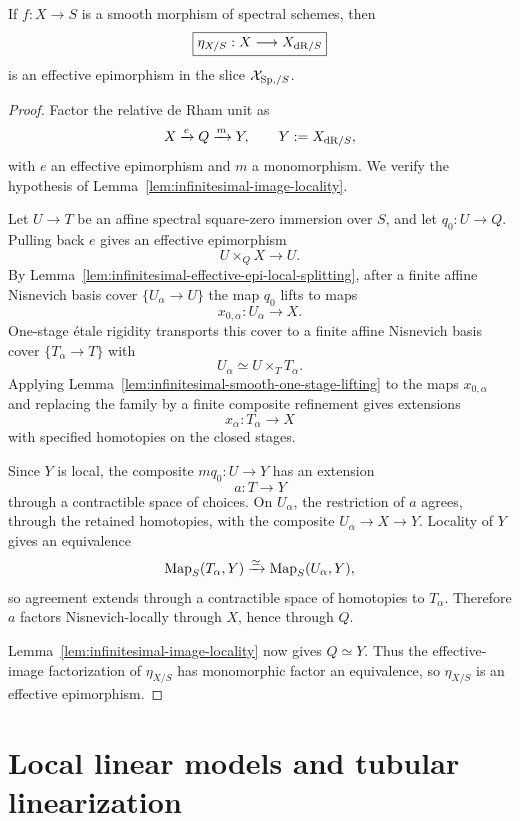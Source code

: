 \begin{theorem}
\label{thm:infinitesimal-smooth-dr-effectivity}
If $f:X\to S$ is a smooth morphism of spectral schemes, then
\[
    \boxed{
    \eta_{X/S}:X\longrightarrow X_{\mathrm{dR}/S}
    }
\]
is an effective epimorphism in the slice $\mathcal X_{\mathrm{Sp},/S}$.
\end{theorem}

\begin{proof}
Factor the relative de Rham unit as
\[
    X\xrightarrow{e}Q\xrightarrow{m}Y,
    \qquad
    Y:=X_{\mathrm{dR}/S},
\]
with $e$ an effective epimorphism and $m$ a monomorphism.  We verify the
hypothesis of Lemma~\ref{lem:infinitesimal-image-locality}.

Let $U\to T$ be an affine spectral square-zero immersion over $S$, and let
$q_0:U\to Q$.  Pulling back $e$ gives an effective epimorphism
\[
    U\times_QX\longrightarrow U.
\]
By Lemma~\ref{lem:infinitesimal-effective-epi-local-splitting}, after a finite
affine Nisnevich basis cover $\{U_\alpha\to U\}$ the map $q_0$ lifts to maps
\[
    x_{0,\alpha}:U_\alpha\longrightarrow X.
\]
One-stage \'etale rigidity transports this cover to a finite affine
Nisnevich basis cover $\{T_\alpha\to T\}$ with
\[
    U_\alpha\simeq U\times_TT_\alpha.
\]
Applying Lemma~\ref{lem:infinitesimal-smooth-one-stage-lifting} to the maps
$x_{0,\alpha}$ and replacing the family by a finite composite refinement
gives extensions
\[
    x_\alpha:T_\alpha\longrightarrow X
\]
with specified homotopies on the closed stages.

Since $Y$ is local, the composite $mq_0:U\to Y$ has an extension
\[
    a:T\longrightarrow Y
\]
through a contractible space of choices.  On $U_\alpha$, the restriction of
$a$ agrees, through the retained homotopies, with the composite
$U_\alpha\to X\to Y$.  Locality of $Y$ gives an equivalence
\[
    \operatorname{Map}_S(T_\alpha,Y)
    \xrightarrow{\simeq}
    \operatorname{Map}_S(U_\alpha,Y),
\]
so agreement extends through a contractible space of homotopies to
$T_\alpha$.  Therefore $a$ factors Nisnevich-locally through $X$, hence
through $Q$.

Lemma~\ref{lem:infinitesimal-image-locality} now gives $Q\simeq Y$.  Thus the
effective-image factorization of $\eta_{X/S}$ has monomorphic factor an
equivalence, so $\eta_{X/S}$ is an effective epimorphism.
\end{proof}

\section{Local linear models and tubular linearization}
\label{sec:infinitesimal-local-linear-models}

